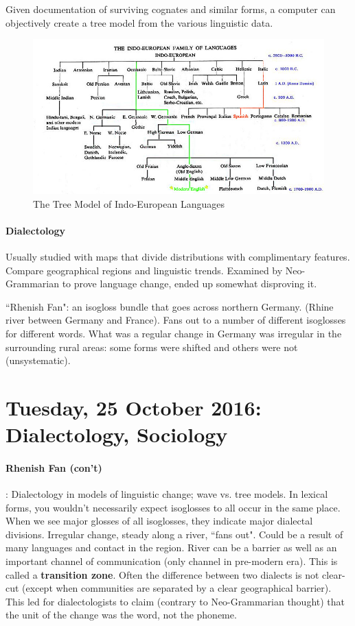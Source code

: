 \documentclass{exam}
\begin{document}
Given documentation of surviving cognates and similar forms, a computer can objectively create a tree model from the various linguistic data. 

\begin{figure}[h!]
\centering
\includegraphics[scale=.6]{images/treemodel.jpg}
\caption{The Tree Model of Indo-European Languages}
\label{fig:download}
\end{figure}

\paragraph{Dialectology} Usually studied with maps that divide distributions with complimentary features. Compare geographical regions and linguistic trends. Examined by Neo-Grammarian to prove language change, ended up somewhat disproving it. 

``Rhenish Fan": an isogloss bundle that goes across northern Germany. (Rhine river between Germany and France). Fans out to a number of different isoglosses for different words. What was a regular change in Germany was irregular in the surrounding rural areas: some forms were shifted and others were not (unsystematic). 

\section*{Tuesday, 25 October 2016: Dialectology, Sociology}

\paragraph{Rhenish Fan (con't)}: Dialectology in models of linguistic change; wave vs. tree models. In lexical forms, you wouldn't necessarily expect isoglosses to all occur in the same place. When we see major glosses of all isoglosses, they indicate major dialectal divisions. Irregular change, steady along a river, ``fans out". Could be a result of many languages and contact in the region. River can be a barrier as well as an important channel of communication (only channel in pre-modern era). This is called a \textbf{transition zone}. Often the difference between two dialects is not clear-cut (except when communities are separated by a clear geographical barrier). This led for dialectologists to claim (contrary to Neo-Grammarian thought) that the unit of the change was the word, not the phoneme. 
\end{document}
